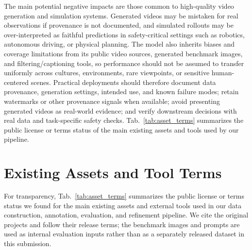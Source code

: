 \noindent The main potential negative impacts are those common to high-quality video generation and simulation systems.
Generated videos may be mistaken for real observations if provenance is not documented, and simulated rollouts may be over-interpreted as faithful predictions in safety-critical settings such as robotics, autonomous driving, or physical planning.
The model also inherits biases and coverage limitations from its public video sources, generated benchmark images, and filtering/captioning tools, so performance should not be assumed to transfer uniformly across cultures, environments, rare viewpoints, or sensitive human-centered scenes.
Practical deployments should therefore document data provenance, generation settings, intended use, and known failure modes; retain watermarks or other provenance signals when available; avoid presenting generated videos as real-world evidence; and verify downstream decisions with real data and task-specific safety checks.
Tab.~\ref{tab:asset_terms} summarizes the public license or terms status of the main existing assets and tools used by our pipeline.

\section{Existing Assets and Tool Terms}
\label{sec:appendix_asset_terms}

For transparency, Tab.~\ref{tab:asset_terms} summarizes the public license or terms status we found for the main existing assets and external tools used in our data construction, annotation, evaluation, and refinement pipeline.
We cite the original projects and follow their release terms; the benchmark images and prompts are used as internal evaluation inputs rather than as a separately released dataset in this submission.

